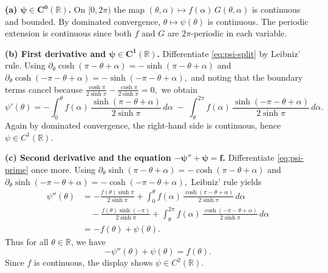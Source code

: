 \begin{solution}
\textbf{(a) $\boldsymbol{\psi\in C^0(\mathbb{R})}$.}
On $[0,2\pi)$ the map $(\theta,\alpha)\mapsto f(\alpha)\,G(\theta,\alpha)$ is continuous and bounded.
By dominated convergence, $\theta\mapsto\psi(\theta)$ is continuous. The periodic extension is continuous
since both $f$ and $G$ are $2\pi$-periodic in each variable.

\medskip
\textbf{(b) First derivative and $\boldsymbol{\psi\in C^1(\mathbb{R})}$.}
Differentiate \eqref{eq:psi-split} by Leibniz' rule. Using
\(
\partial_\theta\cosh(\pi-\theta+\alpha)=-\sinh(\pi-\theta+\alpha)
\)
and
\(
\partial_\theta\cosh(-\pi-\theta+\alpha)=-\sinh(-\pi-\theta+\alpha),
\)
and noting that the boundary terms cancel because
$
\frac{\cosh\pi}{2\sinh\pi}-\frac{\cosh\pi}{2\sinh\pi}=0,
$
we obtain
\begin{equation}\label{eq:psi-prime}
\psi'(\theta)= -\int_0^\theta f(\alpha)\,\frac{\sinh(\pi-\theta+\alpha)}{2\sinh\pi}\,d\alpha
             \;-\; \int_\theta^{2\pi} f(\alpha)\,\frac{\sinh(-\pi-\theta+\alpha)}{2\sinh\pi}\,d\alpha.
\end{equation}
Again by dominated convergence, the right-hand side is continuous, hence $\psi\in C^1(\mathbb{R})$.

\medskip
\textbf{(c) Second derivative and the equation $\boldsymbol{-\psi''+\psi=f}$.}
Differentiate \eqref{eq:psi-prime} once more. Using
\(
\partial_\theta\sinh(\pi-\theta+\alpha)=-\cosh(\pi-\theta+\alpha)
\)
and
\(
\partial_\theta\sinh(-\pi-\theta+\alpha)=-\cosh(-\pi-\theta+\alpha),
\)
Leibniz' rule yields
\begin{align*}
\psi''(\theta)
&=-\frac{f(\theta)\sinh\pi}{2\sinh\pi}+\int_{0}^{\theta} f(\alpha)\,\frac{\cosh(\pi-\theta+\alpha)}{2\sinh\pi}\,d\alpha \\
&\quad-\frac{f(\theta)\sinh(-\pi)}{2\sinh\pi}+\int_{\theta}^{2\pi} f(\alpha)\,\frac{\cosh(-\pi-\theta+\alpha)}{2\sinh\pi}\,d\alpha \\
&=-f(\theta)+\psi(\theta).
\end{align*}
Thus for all $\theta\in\mathbb{R}$, we have
\begin{equation*}
-\psi''(\theta)+\psi(\theta)=f(\theta).
\end{equation*}
Since $f$ is continuous, the display shows $\psi\in C^2(\mathbb{R})$.
\end{solution}

